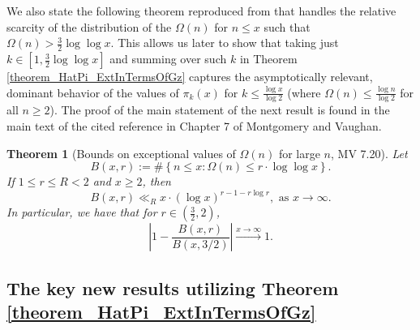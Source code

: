 \documentclass[11pt,reqno,a4letter]{article}
\numberwithin{figure}{section}
\numberwithin{table}{section}
\theoremstyle{plain}
\newtheorem{theorem}{Theorem}
\numberwithin{theorem}{section}
\theoremstyle{definition}
\begin{document}
We also state the following theorem reproduced from \cite[Thm.\ 7.20]{MV} that handles the relative 
scarcity of the distribution of the $\Omega(n)$ for $n \leq x$ such that 
$\Omega(n) > \frac{3}{2} \log\log x$. This allows us later to show that taking just $k \in [1, \frac{3}{2} \log\log x]$ 
and summing over such $k$ in Theorem \ref{theorem_HatPi_ExtInTermsOfGz} captures the asymptotically relevant, dominant 
behavior of the values of $\pi_k(x)$ for $k \leq \frac{\log x}{\log 2}$ (where $\Omega(n) \leq \frac{\log n}{\log 2}$ for 
all $n \geq 2$). The proof of the main statement of the 
next result is found in the main text of the cited reference in Chapter 7 of Montgomery and Vaughan. 

\begin{theorem}[Bounds on exceptional values of $\Omega(n)$ for large $n$, MV 7.20] 
\label{theorem_MV_Thm7.20} 
Let 
\[
B(x, r) := \#\left\{n \leq x: \Omega(n) \leq r \cdot \log\log x\right\}. 
\]
If $1 \leq r \leq R < 2$ and $x \geq 2$, then 
\[
B(x, r) \ll_R x \cdot (\log x)^{r-1-r \log r}, \text{ \ as\ } x \rightarrow \infty. 
\]
In particular, we have that for $r \in \left(\frac{3}{2}, 2\right)$, 
\[
\left\lvert 1 - \frac{B(x, r)}{B(x, 3/2)} \right\rvert \xrightarrow{x \rightarrow \infty} 1. 
\]
\end{theorem} 

\subsection{The key new results utilizing Theorem \ref{theorem_HatPi_ExtInTermsOfGz}} 
\end{document}
